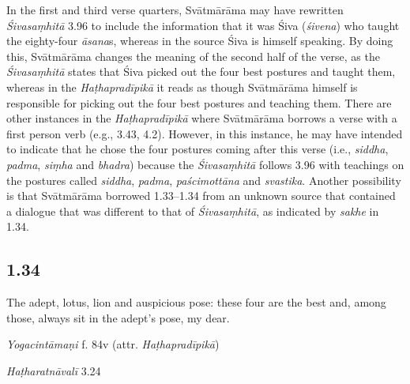 \begin{ekdosis}
\begin{philcomm}[hp01_033]
In the first and third verse quarters, Svātmārāma may have rewritten \emph{Śivasaṃhitā} 3.96 to include the information that it was Śiva (\emph{śivena}) who taught the eighty-four \emph{āsana}s, whereas in the source Śiva is himself speaking. By doing this, Svātmārāma changes the meaning of the second half of the verse, as the \emph{Śivasaṃhitā} states that Śiva picked out the four best postures and taught them, whereas in the \emph{Haṭhapradīpikā} it reads as though Svātmārāma himself is responsible for picking out the four best postures and teaching them. There are other instances in the \emph{Haṭhapradīpikā} where Svātmārāma borrows a verse with a first person verb (e.g., 3.43, 4.2). However, in this instance, he may have intended to indicate that he chose the four postures coming after this verse (i.e., \emph{siddha}, \emph{padma}, \emph{siṃha} and \emph{bhadra}) because the \emph{Śivasaṃhitā} follows 3.96 with teachings on the postures called \emph{siddha}, \emph{padma}, \emph{paścimottāna} and \emph{svastika}. Another possibility is that Svātmārāma borrowed 1.33–1.34 from an unknown source that contained a dialogue that was different to that of \emph{Śivasaṃhitā}, as indicated by \emph{sakhe} in 1.34.
\end{philcomm}

\subsection*{1.34}
\begin{translation}[hp01_034]
The adept, lotus, lion and auspicious pose: these four are the best and, among those, always sit in the adept’s pose, my dear.
\end{translation}


\begin{testimonia}[hp01_034]
\emph{Yogacintāmaṇi} f. 84v (attr. \emph{Haṭhapradīpikā})

\begin{versinnote}
\end{versinnote}

\emph{Haṭharatnāvalī} 3.24

\begin{versinnote}
\tl{\var{tathā ] satve P, sakhe T,t1}\\!}
\end{versinnote}


\end{testimonia}
\end{ekdosis}
